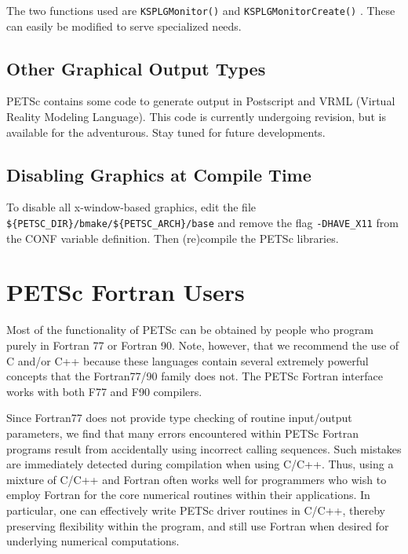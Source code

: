 The two functions used are {\tt KSPLGMonitor()} 
and {\tt KSPLGMonitorCreate()}  . These 
can easily be modified to serve specialized needs.

\section{Other Graphical Output Types}
PETSc contains some code to generate output in Postscript and VRML (Virtual
Reality Modeling Language).  This code is currently undergoing revision, but
is available for the adventurous.  Stay tuned for future developments.

\section{Disabling Graphics at Compile Time}

To disable all x-window-based graphics, edit the file
{\tt \$\{PETSC\_DIR\}/bmake/\$\{PETSC\_ARCH\}/base} and remove the flag
{\tt -DHAVE\_X11} from the CONF variable definition.  Then (re)compile
the PETSc libraries.

\chapter{PETSc Fortran Users}
\label{ch:fortran}

Most of the functionality of PETSc can be obtained by people who
program purely in Fortran 77 or Fortran 90.  Note, however, that we recommend the
use of C and/or C++ because these languages contain several extremely powerful
concepts that the Fortran77/90 family does not. 
The PETSc Fortran interface works with both F77 and F90 compilers.

Since Fortran77 does not provide type checking of routine input/output
parameters, we find that many errors encountered within PETSc Fortran
programs result from accidentally using incorrect calling sequences.
Such mistakes are immediately detected during compilation when using
C/C++.  Thus, using a mixture of C/C++ and Fortran often works well
for programmers who wish to employ Fortran for the core numerical
routines within their applications.  In particular, one can
effectively write PETSc driver routines in C/C++, thereby preserving
flexibility within the program, and still use Fortran when desired for
underlying numerical computations.

